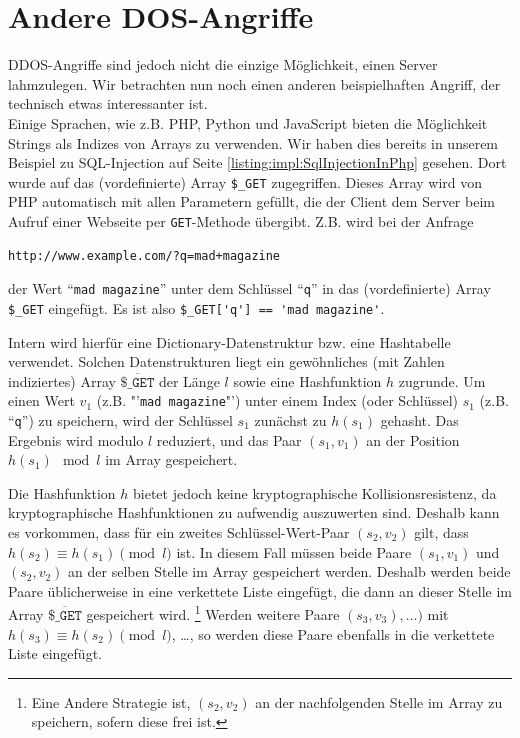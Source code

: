 \section{Andere DOS-Angriffe}
DDOS-Angriffe sind jedoch nicht die einzige Möglichkeit, einen Server lahmzulegen. Wir betrachten nun noch einen anderen beispielhaften Angriff, der technisch etwas interessanter ist.\\

Einige Sprachen, wie z.B. PHP, Python und JavaScript bieten die Möglichkeit Strings als Indizes von Arrays zu verwenden.
Wir haben dies bereits in unserem Beispiel zu SQL-Injection auf Seite \ref{listing:impl:SqlInjectionInPhp} gesehen. Dort wurde auf das (vordefinierte) Array \lstinline+$_GET+ zugegriffen. Dieses Array wird von PHP automatisch mit allen Parametern gefüllt, die der Client dem Server beim Aufruf einer Webseite per \lstinline+GET+-Methode übergibt. Z.B. wird bei der Anfrage
\begin{lstlisting}
http://www.example.com/?q=mad+magazine
\end{lstlisting}

der Wert "`\lstinline+mad magazine+"' unter dem Schlüssel "`\lstinline+q+"' in das (vordefinierte) Array \lstinline+$_GET+ eingefügt. Es ist also \lstinline+$_GET['q'] == 'mad magazine'+.

Intern wird hierfür eine Dictionary-Datenstruktur bzw. eine Hashtabelle verwendet.
Solchen Datenstrukturen liegt ein gewöhnliches (mit Zahlen indiziertes) Array $\overline{\texttt{\$\_GET}}$ der Länge $l$ sowie eine Hashfunktion $h$ zugrunde.
Um einen Wert $v_1$ (z.B. "'\lstinline+mad magazine+"') unter einem Index (oder Schlüssel) $s_1$ (z.B. "`\lstinline+q+"') zu speichern, wird der Schlüssel $s_1$ zunächst zu $h(s_1)$ gehasht.
Das Ergebnis wird modulo $l$ reduziert, und das Paar $(s_1, v_1)$ an der Position $h(s_1) \mod l$ im Array gespeichert.

Die Hashfunktion $h$ bietet jedoch keine kryptographische Kollisionsresistenz, da kryptographische Hashfunktionen zu aufwendig auszuwerten sind.
Deshalb kann es vorkommen, dass für ein zweites Schlüssel-Wert-Paar $(s_2, v_2)$ gilt, dass $h(s_2) \equiv h(s_1) \pmod l$ ist.
In diesem Fall müssen beide Paare $(s_1,v_1)$ und $(s_2,v_2)$ an der selben Stelle im Array gespeichert werden. Deshalb werden beide Paare üblicherweise in eine verkettete Liste eingefügt, die dann an dieser Stelle im Array $\overline{\texttt{\$\_GET}}$ gespeichert wird.%
\footnote{Eine Andere Strategie ist, $(s_2,v_2)$ an der nachfolgenden Stelle im Array zu speichern, sofern diese frei ist.}
Werden weitere Paare $(s_3, v_3), \ldots)$ mit $h(s_3) \equiv h(s_2) \pmod l$, \ldots, so werden diese Paare ebenfalls in die verkettete Liste eingefügt.\\

